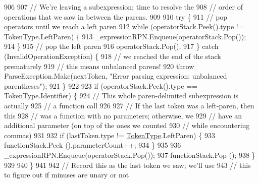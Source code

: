 \begin{DoxyCode}
906 
907                         \textcolor{comment}{// We're leaving a subexpression; time to resolve the}
908                         \textcolor{comment}{// order of operations that we saw in between the parens.}
909 
910                         \textcolor{keywordflow}{try} \{
911                             \textcolor{comment}{// pop operators until we reach a left paren}
912                             \textcolor{keywordflow}{while} (operatorStack.Peek().type != TokenType.LeftParen) \{
913                                 \_expressionRPN.Enqueue(operatorStack.Pop());
914                             \}
915                             \textcolor{comment}{// pop the left paren}
916                             operatorStack.Pop();
917                         \} \textcolor{keywordflow}{catch} (InvalidOperationException) \{
918                             \textcolor{comment}{// we reached the end of the stack prematurely}
919                             \textcolor{comment}{// this means unbalanced parens!}
920                             \textcolor{keywordflow}{throw} ParseException.Make(nextToken, \textcolor{stringliteral}{"Error parsing expression: unbalanced
       parentheses"});
921                         \}
922 
923                         \textcolor{keywordflow}{if} (operatorStack.Peek().type == TokenType.Identifier) \{
924                             \textcolor{comment}{// This whole paren-delimited subexpression is actually}
925                             \textcolor{comment}{// a function call}
926 
927                             \textcolor{comment}{// If the last token was a left-paren, then this}
928                             \textcolor{comment}{// was a function with no parameters; otherwise, we}
929                             \textcolor{comment}{// have an additional parameter (on top of the ones we counted}
930                             \textcolor{comment}{// while encountering commas)}
931 
932                             \textcolor{keywordflow}{if} (lastToken.type != \hyperlink{a00051_a301aa7c866593a5b625a8fc158bbeace}{TokenType}.LeftParen) \{
933                                 functionStack.Peek ().parameterCount++;
934                             \}
935 
936                             \_expressionRPN.Enqueue(operatorStack.Pop());
937                             functionStack.Pop ();
938                         \}
939 
940                     \}
941 
942                     \textcolor{comment}{// Record this as the last token we saw; we'll use}
943                     \textcolor{comment}{// this to figure out if minuses are unary or not}

\end{DoxyCode}

